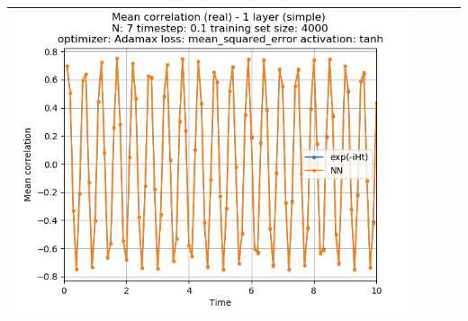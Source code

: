 \documentclass{article}
\begin{document}
\begin{tabular}{|c|c|c|c|}
     \includegraphics[scale=0.37]{./1_layer_simple_train_samples=4000_timestep=0.1_t_total=10.0_optimizer=Adamax_loss=mean_squared_error_activation=tanh/Corr_N=7_(real).png} \\ \hline


\end{tabular}
\end{document}

